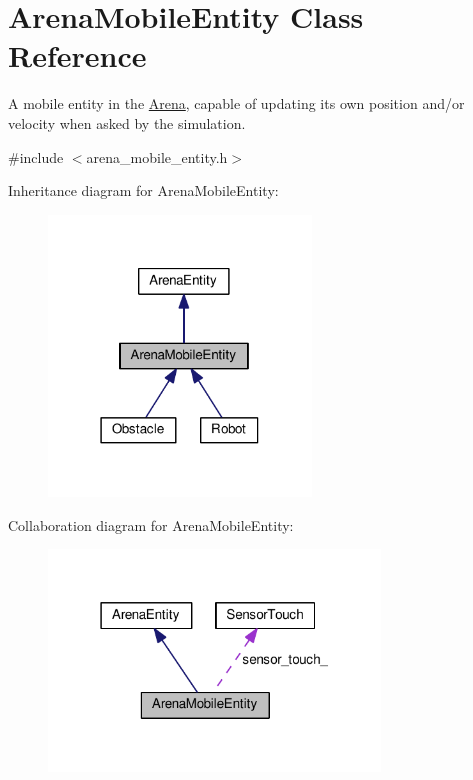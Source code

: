 \hypertarget{classArenaMobileEntity}{}\section{Arena\+Mobile\+Entity Class Reference}
\label{classArenaMobileEntity}


A mobile entity in the \hyperlink{classArena}{Arena}, capable of updating its own position and/or velocity when asked by the simulation.  




{\ttfamily \#include $<$arena\+\_\+mobile\+\_\+entity.\+h$>$}



Inheritance diagram for Arena\+Mobile\+Entity\+:\nopagebreak
\begin{figure}[H]
\begin{center}
\leavevmode
\includegraphics[width=198pt]{classArenaMobileEntity__inherit__graph}
\end{center}
\end{figure}


Collaboration diagram for Arena\+Mobile\+Entity\+:\nopagebreak
\begin{figure}[H]
\begin{center}
\leavevmode
\includegraphics[width=250pt]{classArenaMobileEntity__coll__graph}
\end{center}
\end{figure}
